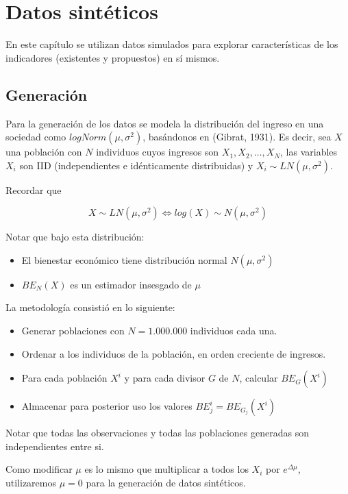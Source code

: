 \chapter{Datos sintéticos} \label{chapter:datos_sinteticos}

En este capítulo se utilizan datos simulados para explorar características de los indicadores (existentes y propuestos) en sí mismos.

\section{Generación}

Para la generación de los datos se modela la distribución del ingreso en una sociedad como $logNorm(\mu,\sigma^2)$, basándonos en (Gibrat, 1931)\cite{gibrat1931inégalités}. Es decir, sea $X$ una población con $N$ individuos cuyos ingresos son $X_1, X_2, \dots, X_N$, las variables $X_i$ son IID (independientes e idénticamente distribuidas) y $X_i \sim LN(\mu, \sigma^2)$.

Recordar que 

$$
    X \sim LN(\mu, \sigma^2) \iff log(X) \sim N(\mu,\sigma^2)
$$

Notar que bajo esta distribución:

\begin{itemize}
    \item El bienestar económico tiene distribución normal $N(\mu,\sigma^2)$
    \item $BE_N(X)$ es un estimador insesgado de $\mu$
\end{itemize}

La metodología consistió en lo siguiente:

\begin{itemize}
    \item Generar poblaciones con $N = 1.000.000$ individuos cada una.
    \item Ordenar a los individuos de la población, en orden creciente de ingresos.
    \item Para cada población $X^i$ y para cada divisor $G$ de $N$, calcular $BE_G(X^i)$
    \item Almacenar para posterior uso los valores $BE_j^i = BE_{G_j}(X^i)$
\end{itemize}

Notar que todas las observaciones y todas las poblaciones generadas son independientes entre si.

Como modificar $\mu$ es lo mismo que multiplicar a todos los $X_i$ por $e^{\Delta \mu}$, utilizaremos $\mu = 0$ para la generación de datos sintéticos.


